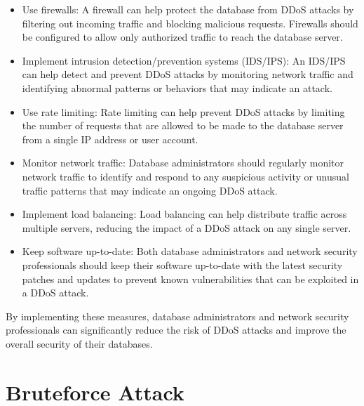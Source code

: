 \documentclass[11pt]{article}
\let\oldsection\section
\renewcommand\section{\clearpage\oldsection}
\begin{document}
\begin{itemize}
\item Use firewalls: A firewall can help protect the database from DDoS attacks by filtering out incoming traffic and blocking malicious requests. Firewalls should be configured to allow only authorized traffic to reach the database server.\\

\item Implement intrusion detection/prevention systems (IDS/IPS): An IDS/IPS can help detect and prevent DDoS attacks by monitoring network traffic and identifying abnormal patterns or behaviors that may indicate an attack.\\

\item Use rate limiting: Rate limiting can help prevent DDoS attacks by limiting the number of requests that are allowed to be made to the database server from a single IP address or user account.\\

\item Monitor network traffic: Database administrators should regularly monitor network traffic to identify and respond to any suspicious activity or unusual traffic patterns that may indicate an ongoing DDoS attack.\\

\item Implement load balancing: Load balancing can help distribute traffic across multiple servers, reducing the impact of a DDoS attack on any single server.\\

\item Keep software up-to-date: Both database administrators and network security professionals should keep their software up-to-date with the latest security patches and updates to prevent known vulnerabilities that can be exploited in a DDoS attack.\\
\end{itemize}

By implementing these measures, database administrators and network security professionals can significantly reduce the risk of DDoS attacks and improve the overall security of their databases.\\

\section{Bruteforce Attack}
\label{sec:org5b7956e}
\end{document}
